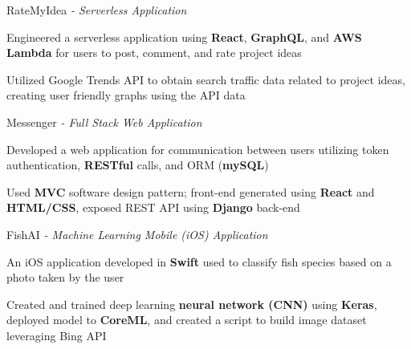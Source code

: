 \begin{siderulesProj}
\par\addvspace{-1.2ex}
\begin{cventriesproject}
  \cventryproject
  {RateMyIdea  \hspace{0.15em}\bodyfontlight\itshape{- Serverless Application}}
  {
    \begin{cvskillitems}
      \item {Engineered a serverless application using \textbf{React}, \textbf{GraphQL}, and \textbf{AWS Lambda} for users to post, comment, and rate project ideas }
      \item {Utilized Google Trends API to obtain search traffic data related to project ideas, creating user friendly graphs using the API data}
    \end{cvskillitems}
  }
  \cventryproject
    {Messenger  \hspace{0.15em}\bodyfontlight\itshape{- Full Stack Web Application}}
    {
      \begin{cvskillitems}
        \item {Developed a web application for communication between users utilizing token authentication, \textbf{RESTful} calls, and ORM (\textbf{mySQL})}
        \item {Used \textbf{MVC} software design pattern; front-end generated using \textbf{React} and \textbf{HTML/CSS}, exposed REST API using \textbf{Django} back-end}
      \end{cvskillitems}
    }
  \cventryproject
    {FishAI  \hspace{0.15em}\bodyfontlight\itshape{- Machine Learning Mobile (iOS) Application}}
    {
      \begin{cvskillitems}
        \item {An iOS application developed in \textbf{Swift} used to classify fish species based on a photo taken by the user}
        \item {Created and trained deep learning \textbf{neural network (CNN)} using \textbf{Keras}, deployed model to \textbf{CoreML}, and created a script to build image dataset leveraging Bing API}
      \end{cvskillitems}
    }
\end{cventriesproject}
\end{siderulesProj}
